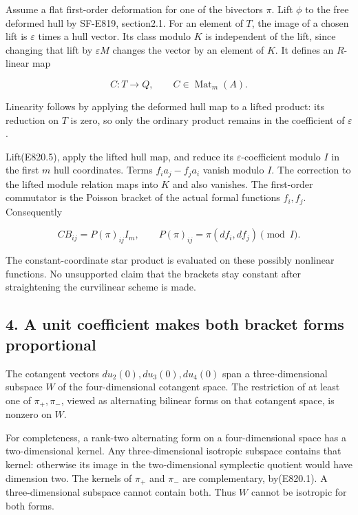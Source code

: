 Assume a flat first-order deformation for one of the bivectors \(\pi\).
Lift \(\phi\) to the free deformed hull by SF-E819, section2.1. For an
element of \(T\), the image of a chosen lift is \(\varepsilon\) times a
hull vector. Its class modulo \(K\) is independent of the lift, since
changing that lift by \(\varepsilon M\) changes the vector by an element
of \(K\). It defines an \(R\)-linear map

\[
 C:T\longrightarrow Q,
 \qquad C\in\operatorname{Mat}_m(A).
 \tag{E820.7}
\]

Linearity follows by applying the deformed hull map to a lifted product:
its reduction on \(T\) is zero, so only the ordinary product remains in
the coefficient of \(\varepsilon\).

Lift(E820.5), apply the lifted hull map, and reduce its
\(\varepsilon\)-coefficient modulo \(I\) in the first \(m\) hull
coordinates. Terms \(f_i a_j-f_j a_i\) vanish modulo \(I\). The
correction to the lifted module relation maps into \(K\) and also
vanishes. The first-order commutator is the Poisson bracket of the
actual formal functions \(f_i,f_j\). Consequently

\[
 C B_{ij}=P(\pi)_{ij}I_m,
 \qquad P(\pi)_{ij}=\pi(df_i,df_j)\pmod I.
 \tag{E820.8}
\]

The constant-coordinate star product is evaluated on these possibly
nonlinear functions. No unsupported claim that the brackets stay
constant after straightening the curvilinear scheme is made.

\subsection{4. A unit coefficient makes both bracket forms
proportional}\label{SF-E820-a-unit-coefficient-makes-both-bracket-forms-proportional}

The cotangent vectors \(du_2(0),du_3(0),du_4(0)\) span a
three-dimensional subspace \(W\) of the four-dimensional cotangent
space. The restriction of at least one of \(\pi_+,\pi_-\), viewed as
alternating bilinear forms on that cotangent space, is nonzero on \(W\).

For completeness, a rank-two alternating form on a four-dimensional
space has a two-dimensional kernel. Any three-dimensional isotropic
subspace contains that kernel: otherwise its image in the
two-dimensional symplectic quotient would have dimension two. The
kernels of \(\pi_+\) and \(\pi_-\) are complementary, by(E820.1). A
three-dimensional subspace cannot contain both. Thus \(W\) cannot be
isotropic for both forms.

